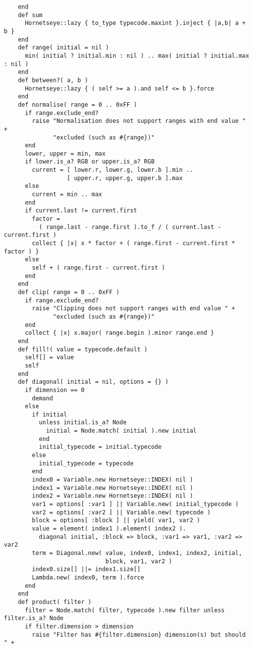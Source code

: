 \begin{lstlisting}
    end
    def sum
      Hornetseye::lazy { to_type typecode.maxint }.inject { |a,b| a + b }
    end
    def range( initial = nil )
      min( initial ? initial.min : nil ) .. max( initial ? initial.max : nil )
    end
    def between?( a, b )
      Hornetseye::lazy { ( self >= a ).and self <= b }.force
    end
    def normalise( range = 0 .. 0xFF )
      if range.exclude_end?
        raise "Normalisation does not support ranges with end value " +
              "excluded (such as #{range})"
      end
      lower, upper = min, max
      if lower.is_a? RGB or upper.is_a? RGB
        current = [ lower.r, lower.g, lower.b ].min ..
                  [ upper.r, upper.g, upper.b ].max
      else
        current = min .. max
      end
      if current.last != current.first
        factor =
          ( range.last - range.first ).to_f / ( current.last - current.first )
        collect { |x| x * factor + ( range.first - current.first * factor ) }
      else
        self + ( range.first - current.first )
      end
    end
    def clip( range = 0 .. 0xFF )
      if range.exclude_end?
        raise "Clipping does not support ranges with end value " +
              "excluded (such as #{range})"
      end
      collect { |x| x.major( range.begin ).minor range.end }
    end
    def fill!( value = typecode.default )
      self[] = value
      self
    end
    def diagonal( initial = nil, options = {} )
      if dimension == 0
        demand
      else
        if initial
          unless initial.is_a? Node
            initial = Node.match( initial ).new initial
          end
          initial_typecode = initial.typecode
        else
          initial_typecode = typecode
        end
        index0 = Variable.new Hornetseye::INDEX( nil )
        index1 = Variable.new Hornetseye::INDEX( nil )
        index2 = Variable.new Hornetseye::INDEX( nil )
        var1 = options[ :var1 ] || Variable.new( initial_typecode )
        var2 = options[ :var2 ] || Variable.new( typecode )
        block = options[ :block ] || yield( var1, var2 )
        value = element( index1 ).element( index2 ).
          diagonal initial, :block => block, :var1 => var1, :var2 => var2
        term = Diagonal.new( value, index0, index1, index2, initial,
                             block, var1, var2 )
        index0.size[] ||= index1.size[]
        Lambda.new( index0, term ).force
      end
    end
    def product( filter )
      filter = Node.match( filter, typecode ).new filter unless filter.is_a? Node
      if filter.dimension > dimension
        raise "Filter has #{filter.dimension} dimension(s) but should " +

\end{lstlisting}
